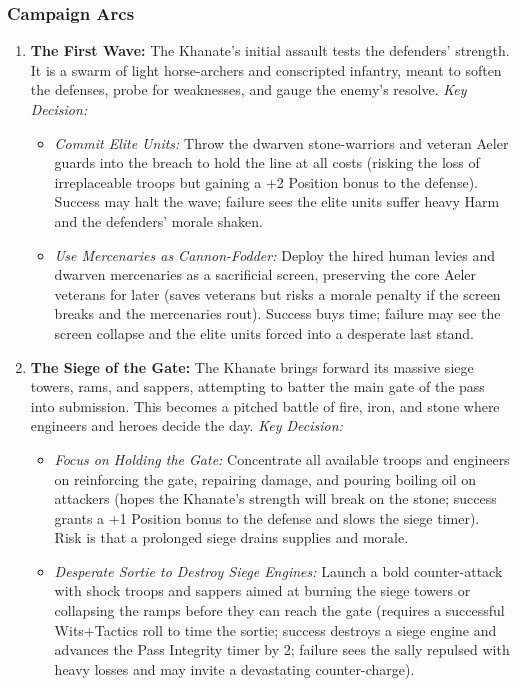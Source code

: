 \documentclass[11pt]{article}
\begin{document}
\subsubsection{Campaign Arcs}
\begin{enumerate}
\item \textbf{The First Wave:} The Khanate's initial assault tests the defenders' strength. It is a swarm of light horse-archers and conscripted infantry, meant to soften the defenses, probe for weaknesses, and gauge the enemy's resolve. \textit{Key Decision:}
\begin{itemize}
\item \textit{Commit Elite Units:} Throw the dwarven stone-warriors and veteran Aeler guards into the breach to hold the line at all costs (risking the loss of irreplaceable troops but gaining a +2 Position bonus to the defense). Success may halt the wave; failure sees the elite units suffer heavy Harm and the defenders' morale shaken.
\item \textit{Use Mercenaries as Cannon-Fodder:} Deploy the hired human levies and dwarven mercenaries as a sacrificial screen, preserving the core Aeler veterans for later (saves veterans but risks a morale penalty if the screen breaks and the mercenaries rout). Success buys time; failure may see the screen collapse and the elite units forced into a desperate last stand.
\end{itemize}
\item \textbf{The Siege of the Gate:} The Khanate brings forward its massive siege towers, rams, and sappers, attempting to batter the main gate of the pass into submission. This becomes a pitched battle of fire, iron, and stone where engineers and heroes decide the day. \textit{Key Decision:}
\begin{itemize}
\item \textit{Focus on Holding the Gate:} Concentrate all available troops and engineers on reinforcing the gate, repairing damage, and pouring boiling oil on attackers (hopes the Khanate's strength will break on the stone; success grants a +1 Position bonus to the defense and slows the siege timer). Risk is that a prolonged siege drains supplies and morale.
\item \textit{Desperate Sortie to Destroy Siege Engines:} Launch a bold counter-attack with shock troops and sappers aimed at burning the siege towers or collapsing the ramps before they can reach the gate (requires a successful Wits+Tactics roll to time the sortie; success destroys a siege engine and advances the Pass Integrity timer by 2; failure sees the sally repulsed with heavy losses and may invite a devastating counter-charge).

\end{itemize}
\end{enumerate}
\end{document}
